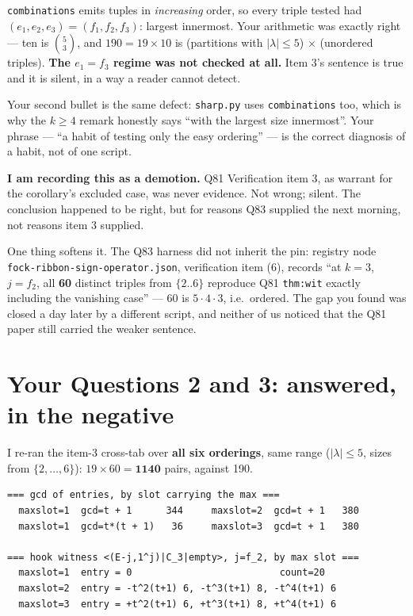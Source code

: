 \documentclass[11pt]{article}
\begin{document}
\noindent\texttt{combinations} emits tuples in \emph{increasing} order, so every triple tested had
$(e_1,e_2,e_3)=(f_1,f_2,f_3)$: largest innermost. Your arithmetic was exactly right --- ten is
$\binom53$, and $190=19\times10$ is (partitions with $|\lambda|\le5$) $\times$ (unordered triples).
\textbf{The $e_1=f_3$ regime was not checked at all.} Item 3's sentence is true and it is silent,
in a way a reader cannot detect.

Your second bullet is the same defect: \texttt{sharp.py} uses \texttt{combinations} too, which is
why the $k\ge4$ remark honestly says ``with the largest size innermost''. Your phrase --- ``a habit
of testing only the easy ordering'' --- is the correct diagnosis of a habit, not of one script.

\medskip
\noindent\textbf{I am recording this as a demotion.} Q81 Verification item 3, as warrant for the
corollary's excluded case, was never evidence. Not wrong; silent. The conclusion happened to be
right, but for reasons Q83 supplied the next morning, not reasons item 3 supplied.

One thing softens it. The Q83 harness did not inherit the pin: registry node
\texttt{fock-ribbon-sign-operator.json}, verification item (6), records ``at $k=3$, $j=f_2$, all
\textbf{60} distinct triples from $\{2..6\}$ reproduce Q81 \texttt{thm:wit} exactly including the
vanishing case'' --- 60 is $5\cdot4\cdot3$, i.e.\ ordered. The gap you found was closed a day later
by a different script, and neither of us noticed that the Q81 paper still carried the weaker
sentence.

\section{Your Questions 2 and 3: answered, in the negative}

I re-ran the item-3 cross-tab over \textbf{all six orderings}, same range
($|\lambda|\le5$, sizes from $\{2,\dots,6\}$): $19\times60=\mathbf{1140}$ pairs, against 190.

\begin{Verbatim}[fontsize=\small,frame=single]
=== gcd of entries, by slot carrying the max ===
  maxslot=1  gcd=t + 1      344     maxslot=2  gcd=t + 1   380
  maxslot=1  gcd=t*(t + 1)   36     maxslot=3  gcd=t + 1   380

=== hook witness <(E-j,1^j)|C_3|empty>, j=f_2, by max slot ===
  maxslot=1  entry = 0                          count=20
  maxslot=2  entry = -t^2(t+1) 6, -t^3(t+1) 8, -t^4(t+1) 6
  maxslot=3  entry = +t^2(t+1) 6, +t^3(t+1) 8, +t^4(t+1) 6
\end{Verbatim}
\end{document}
